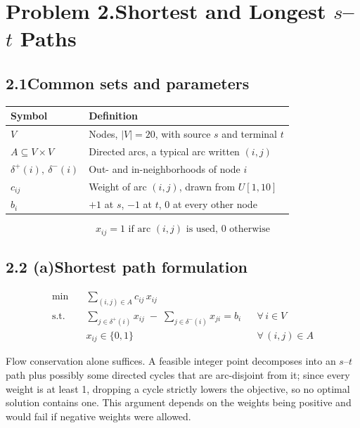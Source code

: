 \documentclass[11pt]{article}
\DeclareMathOperator*{\minimize}{min}
\begin{document}
\section*{Problem 2.\quad Shortest and Longest $s$--$t$ Paths \quad[40 pts]}

\subsection*{2.1\quad Common sets and parameters}

\begin{center}
\begin{tabular}{@{}ll@{}}
\toprule
Symbol & Definition \\
\midrule
$V$ & Nodes, $|V| = 20$, with source $s$ and terminal $t$ \\
$A \subseteq V \times V$ & Directed arcs, a typical arc written $(i,j)$ \\
$\delta^{+}(i),\ \delta^{-}(i)$ & Out- and in-neighborhoods of node $i$ \\
$c_{ij}$ & Weight of arc $(i,j)$, drawn from $U[1,10]$ \\
$b_i$ & $+1$ at $s$, $-1$ at $t$, 0 at every other node \\
\bottomrule
\end{tabular}
\end{center}

\[
  x_{ij} = 1 \text{ if arc } (i,j) \text{ is used, 0 otherwise}
\]

\subsection*{2.2 (a)\quad Shortest path formulation}

\begin{align}
  \minimize \quad & \sum_{(i,j) \in A} c_{ij}\, x_{ij} \\[4pt]
  \text{s.t.} \quad
    & \sum_{j \in \delta^{+}(i)} x_{ij} \;-\; \sum_{j \in \delta^{-}(i)} x_{ji}
      = b_i && \forall\, i \in V \\[2pt]
    & x_{ij} \in \{0,1\} && \forall\, (i,j) \in A
\end{align}

Flow conservation alone suffices. A feasible integer point decomposes
into an $s$--$t$ path plus possibly some directed cycles that are
arc-disjoint from it; since every weight is at least 1, dropping a cycle
strictly lowers the objective, so no optimal solution contains one. This
argument depends on the weights being positive and would fail if
negative weights were allowed.
\end{document}
